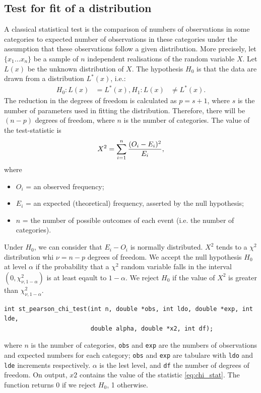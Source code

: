 \subsection{Test for fit of a distribution}

A classical statistical test is the comparison of numbers of
observations in some categories to expected number of observations in
these categories under the assumption that these observations follow a
given distribution.
More precisely, let $\{x_1 \ldots x_n\}$ be a sample of $n$
independent realisations of the random variable $X$.
Let $L(x)$ be the unknown distribution of $X$.
The hypothesis $H_0$ is that the data are drawn from a distribution
$L^*(x)$, i.e.:
\begin{align*}
H_0: L(x) &= L^*(x),
H_1: L(x) &\neq L^*(x).
\end{align*}
The reduction in the degrees of freedom is calculated as $p=s+1$,
where $s$ is the number of parameters used in fitting the
distribution.
Therefore, there will be $(n - p)$ degrees of freedom, where $n$ is
the number of categories. The value of the test-statistic is
\begin{equation}
  X^2 = \sum_{i=1}^{n} {(O_i - E_i)^2 \over E_i},
\label{eq:chi_stat}
\end{equation}
where
\begin{itemize}
\item
$O_i$ = an observed frequency;
\item
$E_i$ = an expected (theoretical) frequency, asserted by the null
hypothesis;
\item
$n$ = the number of possible outcomes of each event (i.e. the number
of categories).
\end{itemize}
Under $H_0$, we can consider that $E_i - O_i$ is normally distributed.
$X^2$ tends to a $\chi ^2$ distribution whi $\nu = n-p$ degrees of freedom.
We accept the null hypothesis $H_0$ at level $\alpha$ if the
probability that a $\chi^2$ random variable falls in the interval
$(0,\chi^2_{\nu,1-\alpha})$ is at least eqault to $1 - \alpha$.
We reject $H_0$ if the value of $X^2$ is greater than
$\chi^2_{\nu,1-\alpha}$.

\begin{verbatim}
int st_pearson_chi_test(int n, double *obs, int ldo, double *exp, int lde,
                        double alpha, double *x2, int df);
\end{verbatim}
where $n$ is the number of categories, \verb|obs| and \verb|exp| are
the numbers of observations and expected numbers for each category;
\verb|obs| and \verb|exp| are tabulare with \verb|ldo| and \verb|lde|
increments respectively. $\alpha$ is the lest level, and \verb|df| the
number of degrees of freedom. On output, $x2$ contains the value of
the statistic \ref{eq:chi_stat}.
The function returns 0 if we reject $H_0$, 1 otherwise.
